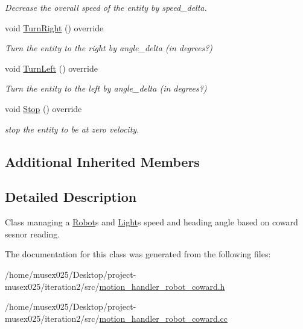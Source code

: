 \begin{DoxyCompactItemize}
\begin{DoxyCompactList}\small\item\em Decrease the overall speed of the entity by speed\+\_\+delta. \end{DoxyCompactList}\item 
void \hyperlink{classMotionHandlerRobotCoward_ad1244c83f6c9f81d28f1080dbe955e89}{Turn\+Right} () override\hypertarget{classMotionHandlerRobotCoward_ad1244c83f6c9f81d28f1080dbe955e89}{}\label{classMotionHandlerRobotCoward_ad1244c83f6c9f81d28f1080dbe955e89}

\begin{DoxyCompactList}\small\item\em Turn the entity to the right by angle\+\_\+delta (in degrees?) \end{DoxyCompactList}\item 
void \hyperlink{classMotionHandlerRobotCoward_af0f39f6289c90aa5d8e1db3fee3bf6f0}{Turn\+Left} () override\hypertarget{classMotionHandlerRobotCoward_af0f39f6289c90aa5d8e1db3fee3bf6f0}{}\label{classMotionHandlerRobotCoward_af0f39f6289c90aa5d8e1db3fee3bf6f0}

\begin{DoxyCompactList}\small\item\em Turn the entity to the left by angle\+\_\+delta (in degrees?) \end{DoxyCompactList}\item 
void \hyperlink{classMotionHandlerRobotCoward_a532bf275aa6bd551378c581a890ba54f}{Stop} () override\hypertarget{classMotionHandlerRobotCoward_a532bf275aa6bd551378c581a890ba54f}{}\label{classMotionHandlerRobotCoward_a532bf275aa6bd551378c581a890ba54f}

\begin{DoxyCompactList}\small\item\em stop the entity to be at zero velocity. \end{DoxyCompactList}\end{DoxyCompactItemize}
\subsection*{Additional Inherited Members}


\subsection{Detailed Description}
Class managing a \hyperlink{classRobot}{Robot}\textquotesingle{}s and \hyperlink{classLight}{Light}\textquotesingle{}s speed and heading angle based on coward sesnor reading. 

The documentation for this class was generated from the following files\+:\begin{DoxyCompactItemize}
\item 
/home/musex025/\+Desktop/project-\/musex025/iteration2/src/\hyperlink{motion__handler__robot__coward_8h}{motion\+\_\+handler\+\_\+robot\+\_\+coward.\+h}\item 
/home/musex025/\+Desktop/project-\/musex025/iteration2/src/\hyperlink{motion__handler__robot__coward_8cc}{motion\+\_\+handler\+\_\+robot\+\_\+coward.\+cc}\end{DoxyCompactItemize}

